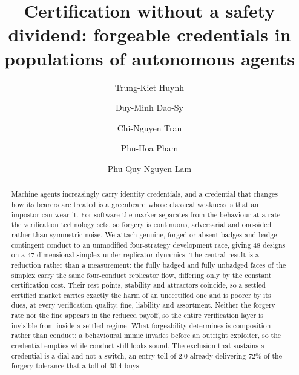 \documentclass[preprint,12pt]{elsarticle}
\theoremstyle{plain}
\theoremstyle{definition}
\begin{document}
\begin{frontmatter}

\title{Certification without a safety dividend: forgeable credentials in
populations of autonomous agents}

\author[hcmus]{Trung-Kiet Huynh}

\author[hcmus]{Duy-Minh Dao-Sy}

\author[hcmus]{Chi-Nguyen Tran}

\author[hcmus]{Phu-Hoa Pham}

\author[hcmus]{Phu-Quy Nguyen-Lam}



\begin{abstract}
Machine agents increasingly carry identity credentials, and a credential that
changes how its bearers are treated is a greenbeard whose classical weakness is
that an impostor can wear it. For software the marker separates from the
behaviour at a rate the verification technology sets, so forgery is continuous,
adversarial and one-sided rather than symmetric noise. We attach genuine,
forged or absent badges and badge-contingent conduct to an unmodified
four-strategy development race, giving 48 designs on a 47-dimensional simplex
under replicator dynamics. The central result is a reduction rather than a
measurement: the fully badged and fully unbadged faces of the simplex carry the
same four-conduct replicator flow, differing only by the constant certification
cost. Their rest points, stability and attractors coincide, so a settled
certified market carries exactly the harm of an uncertified one and is poorer
by its dues, at every verification quality, fine, liability and assortment.
Neither the forgery rate nor the fine appears in the reduced payoff, so the
entire verification layer is invisible from inside a settled regime. What
forgeability determines is composition rather than conduct: a behavioural mimic
invades before an outright exploiter, so the credential empties while conduct
still looks sound. The exclusion that sustains a credential is a dial and not a
switch, an entry toll of $2.0$ already delivering $72\%$ of the forgery
tolerance that a toll of $30.4$ buys.
\end{abstract}


\end{frontmatter}
\end{document}
